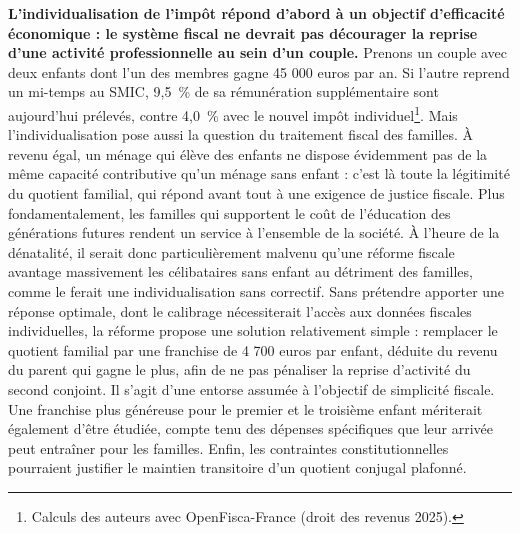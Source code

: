 \documentclass[10pt,a4paper]{article}
\begin{document}
\textbf{L’individualisation de l’impôt répond d’abord à un objectif d’efficacité économique : le système fiscal ne devrait pas décourager la reprise d’une activité professionnelle au sein d’un couple.} Prenons un couple avec deux enfants dont l’un des membres gagne 45 000 euros par an. Si l’autre reprend un mi-temps au SMIC, 9,5~\% de sa rémunération supplémentaire sont aujourd’hui prélevés, contre 4,0~\% avec le nouvel impôt individuel\footnote{Calculs des auteurs avec OpenFisca-France (droit des revenus 2025).}. Mais l’individualisation pose aussi la question du traitement fiscal des familles. À revenu égal, un ménage qui élève des enfants ne dispose évidemment pas de la même capacité contributive qu’un ménage sans enfant : c’est là toute la légitimité du quotient familial, qui répond avant tout à une exigence de justice fiscale. Plus fondamentalement, les familles qui supportent le coût de l’éducation des générations futures rendent un service à l’ensemble de la société. À l’heure de la dénatalité, il serait donc particulièrement malvenu qu’une réforme fiscale avantage massivement les célibataires sans enfant au détriment des familles, comme le ferait une individualisation sans correctif. Sans prétendre apporter une réponse optimale, dont le calibrage nécessiterait l’accès aux données fiscales individuelles, la réforme propose une solution relativement simple : remplacer le quotient familial par une franchise de 4 700 euros par enfant, déduite du revenu du parent qui gagne le plus, afin de ne pas pénaliser la reprise d’activité du second conjoint. Il s’agit d’une entorse assumée à l’objectif de simplicité fiscale. Une franchise plus généreuse pour le premier et le troisième enfant mériterait également d’être étudiée, compte tenu des dépenses spécifiques que leur arrivée peut entraîner pour les familles. Enfin, les contraintes constitutionnelles pourraient justifier le maintien transitoire d’un quotient conjugal plafonné.

\end{document}
